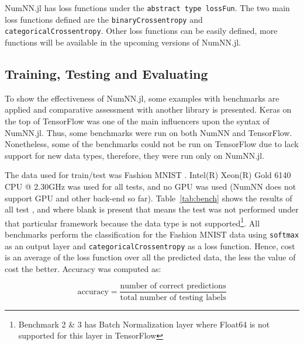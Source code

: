 NumNN.jl has loss functions under the \texttt{abstract type lossFun}. The two main loss functions defined are the \texttt{binaryCrossentropy} and \texttt{categoricalCrossentropy}. Other loss functions can be easily defined, more functions will be available in the upcoming versions of NumNN.jl.


\subsection{Training, Testing and Evaluating}
To show the effectiveness of NumNN.jl, some examples with benchmarks are applied and comparative assessment with another library is presented. Keras \cite{Collet2015} on the top of TensorFlow was one of the main influencers upon the syntax of NumNN.jl. Thus, some benchmarks were run on both NumNN and TensorFlow. Nonetheless, some of the benchmarks could not be run on TensorFlow due to lack support for new data types, therefore, they were run only on NumNN.jl.

The data used for train/test was Fashion MNIST \cite{Xiao2017}. Intel(R) Xeon(R) Gold 6140 CPU @ 2.30GHz was used for all tests, and no GPU was used (NumNN does not support GPU and other back-end so far). Table~\ref{tab:bench} shows the results of all test%
, and where blank is present that means the test was not performed under that particular framework because the data type is not supported\footnote{\label{batchnorm}Benchmark 2 \& 3 has Batch Normalization layer where Float64 is not supported for this layer in TensorFlow}. All benchmarks perform the classification for the Fashion MNIST data using \texttt{softmax} as an output layer and \texttt{categoricalCrossentropy} as a loss function. Hence, cost is an average of the loss function over all the predicted data, the less the value of cost the better. Accuracy was computed as:

\begin{equation}
\textrm{accuracy} = \frac{\textrm{number of correct predictions}}{\textrm{total number of testing labels}}
\end{equation}


